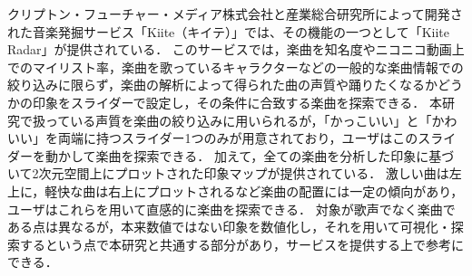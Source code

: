 クリプトン・フューチャー・メディア株式会社と産業総合研究所によって開発された音楽発掘サービス「Kiite（キイテ）」では、その機能の一つとして「Kiite Radar」が提供されている\cite{kiite}．
このサービスでは，楽曲を知名度やニコニコ動画上でのマイリスト率，楽曲を歌っているキャラクターなどの一般的な楽曲情報での絞り込みに限らず，楽曲の解析によって得られた曲の声質や踊りたくなるかどうかの印象をスライダーで設定し，その条件に合致する楽曲を探索できる．
本研究で扱っている声質を楽曲の絞り込みに用いられるが，「かっこいい」と「かわいい」を両端に持つスライダー1つのみが用意されており，ユーザはこのスライダーを動かして楽曲を探索できる．
加えて，全ての楽曲を分析した印象に基づいて2次元空間上にプロットされた印象マップが提供されている．
激しい曲は左上に，軽快な曲は右上にプロットされるなど楽曲の配置には一定の傾向があり，ユーザはこれらを用いて直感的に楽曲を探索できる．
対象が歌声でなく楽曲である点は異なるが，本来数値ではない印象を数値化し，それを用いて可視化・探索するという点で本研究と共通する部分があり，サービスを提供する上で参考にできる．

